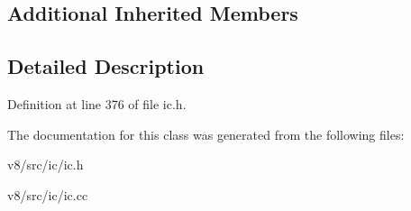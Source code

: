 \subsection*{Additional Inherited Members}


\subsection{Detailed Description}


Definition at line 376 of file ic.\+h.



The documentation for this class was generated from the following files\+:\begin{DoxyCompactItemize}
\item 
v8/src/ic/ic.\+h\item 
v8/src/ic/ic.\+cc\end{DoxyCompactItemize}
